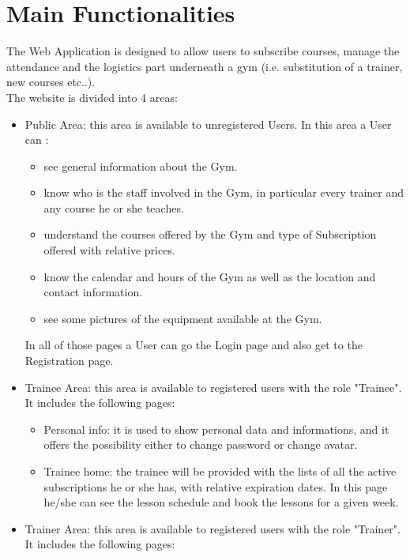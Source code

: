 \section{Main Functionalities}

The Web Application is designed to allow users to subscribe courses, manage the attendance and the logistics part underneath a gym (i.e. substitution of a trainer, new courses etc..).\\
The website is divided into 4 areas:

\begin{itemize}
	\item Public Area: this area is available to unregistered Users. In this area a User can :
	\begin{itemize}
		\item see general information about the Gym.
		\item know who is the staff involved in the Gym, in particular every trainer and any course he or she teaches.
		\item understand the courses offered by the Gym and type of Subscription offered with relative prices.
		\item know the calendar and hours of the Gym as well as the location and contact information.
		\item see some pictures of the equipment available at the Gym.
	\end{itemize}	 
	In all of those pages a User can go the Login page and also get to the Registration page. 
	\item Trainee Area: this area is available to registered users with the role "Trainee". It includes the following pages:
	\begin{itemize}
		\item Personal info: it is used to show personal data and informations, and it offers the possibility either to change password or change avatar.
		\item Trainee home: the trainee will be provided with the lists of all the active subscriptions he or she has, with relative expiration dates. In this page he/she can see the lesson schedule and book the lessons for a given week.
	\end{itemize}
	\item Trainer Area: this area is available to registered users with the role "Trainer". It includes the following pages:
	\begin{itemize}

\end{itemize}
\end{itemize}
